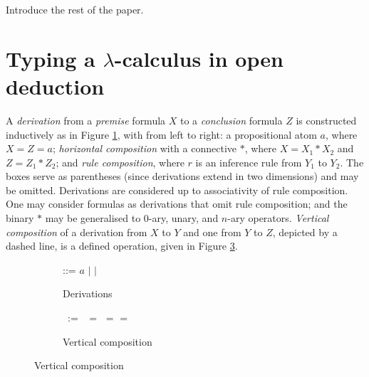 \documentclass[a4paper,UKenglish,cleveref, autoref]{lipics-v2019}
\begin{document}
{\color{red} Introduce the rest of the paper.}

\section{Typing a $\lambda$-calculus in open deduction}

A \emph{derivation} from a \emph{premise} formula $X$ to a \emph{conclusion} formula $Z$ is constructed inductively as in Figure \ref{fig:derivations}, with from left to right: a propositional atom $a$, where $X = Z = a$; \emph{horizontal composition} with a connective $*$, where $X = X_{1} * X_{2}$ and $Z = Z_{1} * Z_{2}$; and \emph{rule composition}, where $r$ is an inference rule from $Y_{1}$ to $Y_{2}$. The boxes serve as parentheses (since derivations extend in two dimensions) and may be omitted. Derivations are considered up to associativity of rule composition. One may consider formulas as derivations that omit rule composition; and the binary $*$ may be generalised to $0$-ary, unary, and $n$-ary operators. \emph{Vertical composition} of a derivation from $X$ to $Y$ and one from $Y$ to $Z$, depicted by a dashed line, is a defined operation, given in Figure \ref{fig:vertical}.

\begin{figure}[h]
	\centering
	\begin{subfigure}[b]{0.3\textwidth}
{ \small
{} {:}{:}{=} $a$ $\vert$  $\vert$ 
}
	\caption{Derivations}
	\label{fig:derivations}
	\end{subfigure}
	\hfill
	\begin{subfigure}[b]{0.6\textwidth}
{ \small
{} ~{:}{=}~  $=$  $=$ 
} \hfill
{\small
{}
=
}
	\caption{Vertical composition}
	\label{fig:vertical}
	\end{subfigure}
\end{figure}
\end{document}
